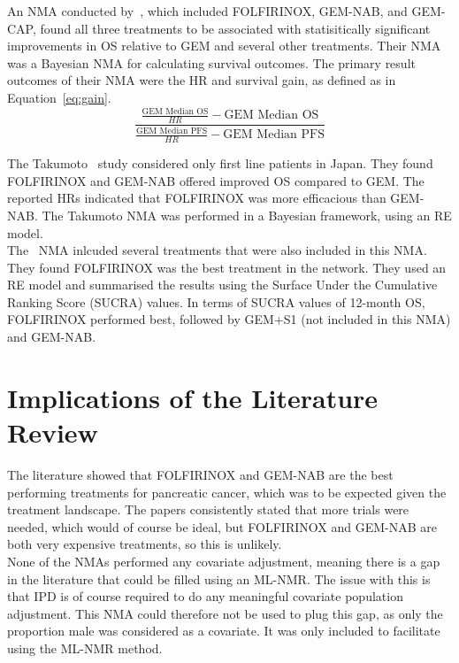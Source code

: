 An NMA conducted by~\cite{gresham2014}, which included FOLFIRINOX, GEM-NAB, and GEM-CAP, found all three treatments to be associated with statisitically significant improvements in OS relative to GEM and several other treatments. Their NMA was a Bayesian NMA for calculating survival outcomes. The primary result outcomes of their NMA were the HR and survival gain, as defined as in Equation~\ref{eq:gain}. \\

\begin{equation}
    \frac{\frac{\text{GEM Median OS}}{HR}-\text{GEM Median OS}}{\frac{\text{GEM Median PFS}}{HR}-\text{GEM Median PFS}}
    \label{eq:gain}
\end{equation}

The Takumoto~\cite{takumoto} study considered only first line patients in Japan. They found FOLFIRINOX and GEM-NAB offered improved OS compared to GEM. The reported HRs indicated that FOLFIRINOX was more efficacious than GEM-NAB. The Takumoto NMA was performed in a Bayesian framework, using an RE model. \\

The~\cite{zhang} NMA inlcuded several treatments that were also included in this NMA. They found FOLFIRINOX was the best treatment in the network. They used an RE model and summarised the results using the Surface Under the Cumulative Ranking Score (SUCRA) values. In terms of SUCRA values of 12-month OS, FOLFIRINOX performed best, followed by GEM+S1 (not included in this NMA) and GEM-NAB. 

\section{Implications of the Literature Review}
The literature showed that FOLFIRINOX and GEM-NAB are the best performing treatments for pancreatic cancer, which was to be expected given the treatment landscape. The papers consistently stated that more trials were needed, which would of course be ideal, but FOLFIRINOX and GEM-NAB are both very expensive treatments, so this is unlikely. \\

None of the NMAs performed any covariate adjustment, meaning there is a gap in the literature that could be filled using an ML-NMR. The issue with this is that IPD is of course required to do any meaningful covariate population adjustment. This NMA could therefore not be used to plug this gap, as only the proportion male was considered as a covariate. It was only included to facilitate using the ML-NMR method.  